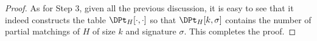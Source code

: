 \begin{proof}



    As for Step 3, given all the previous discussion,
    it is easy to see that it indeed constructs the table $\DPt_H[\cdot,\cdot]$
    so that $\DPt_H[k,\sigma]$ contains the number of partial matchings of $H$ of size $k$ and signature $\sigma$.
    This completes the proof.
\end{proof}













